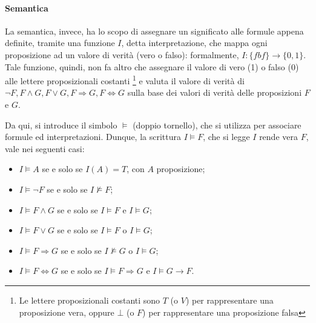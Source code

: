 \paragraph*{Semantica}
La semantica, invece, ha lo scopo di assegnare un significato alle formule appena definite, tramite una funzione \(I\), detta interpretazione, che mappa ogni proposizione ad un valore di verità (vero o falso): formalmente, \(I: \{fbf\} \to \{0,1\}\). Tale funzione, quindi, non fa altro che assegnare il valore di vero (1) o falso (0) alle lettere proposizionali costanti \footnote{Le lettere proposizionali costanti sono \(T\) (o \(V\)) per rappresentare una proposizione vera, oppure \(\bot\) (o \(F\)) per rappresentare una proposizione falsa} e valuta il valore di verità di \(\lnot F, F \wedge G, F \vee G, F \Rightarrow G, F \Leftrightarrow G\) sulla base dei valori di verità delle proposizioni \(F\) e \(G\). 

Da qui, si introduce il simbolo \(\vDash\) (doppio tornello), che si utilizza per associare formule ed interpretazioni. Dunque, la scrittura \(I \vDash F\), che si legge \(I\) rende vera \(F\), vale nei seguenti casi:
\begin{itemize}
  \item \(I \vDash A\) se e solo se \(I(A) = T\), con \(A\) proposizione;
  \item \(I \vDash \lnot F\) se e solo se \(I \nvDash F\);
  \item \(I \vDash F \wedge G\) se e solo se \(I\vDash F\) e \(I \vDash G\);
  \item \(I \vDash F \vee G\) se e solo se \(I \vDash F\) o \(I \vDash G\);
  \item \(I \vDash F \Rightarrow G\) se e solo se \(I \nvDash G\) o \(I \vDash G\);
  \item \(I \vDash F \Leftrightarrow G\) se e solo se \(I \vDash F\Rightarrow G\) e \(I \vDash G \rightarrow F\).
\end{itemize}

